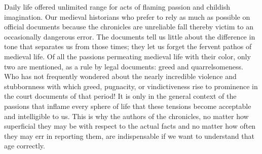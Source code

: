 Daily life offered unlimited range for acts of flaming passion and
childish imagination. Our medieval historians who prefer to rely
\protect\hypertarget{08_Chapter_One__THE_PASSIONATE_INTE.xhtmlux5cux23page_9}{}{}as
much as possible on official documents because the chronicles are
unreliable fall thereby victim to an occasionally dangerous error. The
documents tell us little about the difference in tone that separates us
from those times; they let us forget the fervent pathos of medieval
life. Of all the passions permeating medieval life with their color,
only two are mentioned, as a rule by legal documents: greed and
quarrelsomeness. Who has not frequently wondered about the nearly
incredible violence and stubbornness with which greed, pugnacity, or
vindictiveness rise to prominence in the court documents of that period!
It is only in the general context of the passions that inflame every
sphere of life that these tensions become acceptable and intelligible to
us. This is why the authors of the chronicles, no matter how superficial
they may be with respect to the actual facts and no matter how often
they may err in reporting them, are indispensable if we want to
understand that age correctly.

